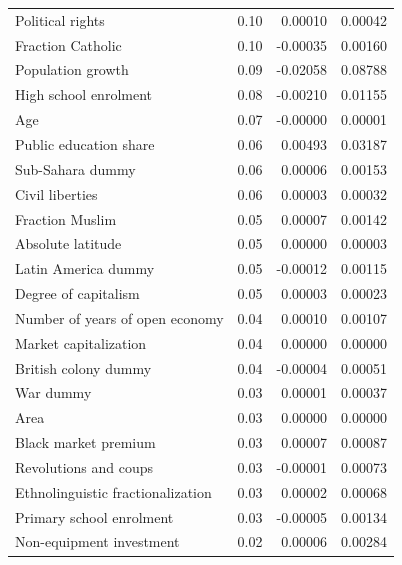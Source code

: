 \begin{refsection}
\begin{table}[!htbp]
\begin{tabular}{lrrr}
  Political rights & 0.10 & 0.00010 & 0.00042 \\ 
  Fraction Catholic & 0.10 & -0.00035 & 0.00160 \\ 
  Population growth & 0.09 & -0.02058 & 0.08788 \\ 
  High school enrolment & 0.08 & -0.00210 & 0.01155 \\ 
  Age & 0.07 & -0.00000 & 0.00001 \\ 
  Public education share & 0.06 & 0.00493 & 0.03187 \\ 
  Sub-Sahara dummy & 0.06 & 0.00006 & 0.00153 \\
  Civil liberties & 0.06 & 0.00003 & 0.00032 \\
  Fraction Muslim & 0.05 & 0.00007 & 0.00142 \\
  Absolute latitude & 0.05 & 0.00000 & 0.00003 \\
  Latin America dummy & 0.05 & -0.00012 & 0.00115 \\
  Degree of capitalism & 0.05 & 0.00003 & 0.00023 \\ 
  Number of years of open economy & 0.04 & 0.00010 & 0.00107 \\ 
  Market capitalization & 0.04 & 0.00000 & 0.00000 \\
  British colony dummy & 0.04 & -0.00004 & 0.00051 \\
  War dummy & 0.03 & 0.00001 & 0.00037 \\ 
  Area & 0.03 & 0.00000 & 0.00000 \\ 
  Black market premium & 0.03 & 0.00007 & 0.00087 \\
  Revolutions and coups & 0.03 & -0.00001 & 0.00073 \\ 
  Ethnolinguistic fractionalization & 0.03 & 0.00002 & 0.00068 \\
  Primary school enrolment & 0.03 & -0.00005 & 0.00134 \\
  Non-equipment investment & 0.02 & 0.00006 & 0.00284 \\  
  	 \bottomrule
	\end{tabular}
\end{table}


\end{refsection}
